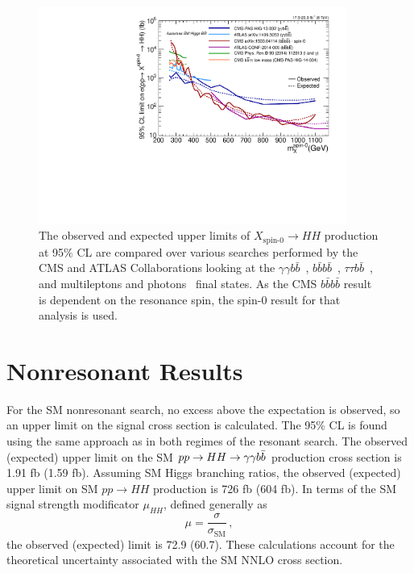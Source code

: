 \begin{figure}[htbp!]
 \begin{center}
   \includegraphics[width=0.9\textwidth]{figures/results/limit_comparison_all.pdf}
 \end{center}
\caption{The observed and expected upper limits of $X_\text{spin-0} \rightarrow HH$ production
at 95\% CL are compared over various searches performed by the CMS and ATLAS Collaborations
looking at the $\gamma \gamma b\bar{b}$~\cite{CMS-PAS-HIG-13-032,Aad:2014yja},
$b\bar{b}b\bar{b}$~\cite{Khachatryan:2015yea,ATLAS-CONF-2014-005},
$\tau\tau b\bar{b}$~\cite{CMS-PAS-HIG-14-034}, and
multileptons and photons~\cite{PhysRevD.90.112013}
final states. As the CMS $b\bar{b}b\bar{b}$ result is dependent on the
resonance spin, the spin-0 result for that analysis is used.}
\label{fig:limit_comp}
\end{figure}

\section{Nonresonant Results\label{sec:nonresresults}}

For the SM nonresonant search,
no excess above the expectation is observed, so an upper limit on the signal cross section is
calculated. The 95\% CL is found using the same approach as in both
regimes of the resonant search. The observed (expected) upper limit on the SM
$pp \rightarrow HH \rightarrow \gamma\gamma b\bar{b}$ production cross section is 1.91 fb (1.59 fb).
Assuming SM Higgs branching ratios, the observed (expected) upper limit on SM $pp \rightarrow HH$
production is 726 fb (604 fb). In terms of the SM signal strength modificator $\mu_{HH}$, defined
generally as
\begin{equation}
\mu = \frac{\sigma}{\sigma_\text{SM}} \, ,
\end{equation}
the observed (expected) limit is 72.9 (60.7). These calculations account for the theoretical
uncertainty associated with the SM NNLO cross section.


